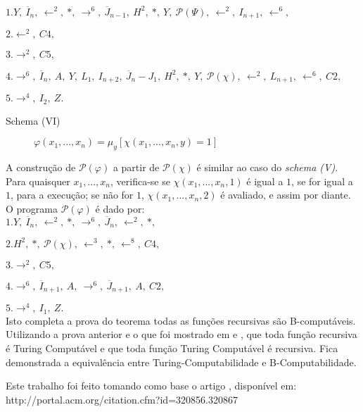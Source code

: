 \documentclass[10pt,letterpaper]{article}
\begin{document}
$1.Y,\ \overline{I}_n,\ \leftarrow^2,\ *,\ \rightarrow^6,\ \overline{J}_{n-1},\ H^2,\ *,\ Y,\ \mathcal{P}(\Psi),\ \leftarrow^2,\ I_{n+1},\ \leftarrow^6,$

$2.\leftarrow^2,\ C4,$

$3.\rightarrow^2,\ C5,$

$4.\rightarrow^6,\ \overline{I}_n,\ A,\ Y,\ L_1,\ I_{n+2},\ \overline{J}_n - J_1,\ H^2,\ *,\ Y,\ \mathcal{P}(\chi),\ \leftarrow^2,\ L_{n+1},\ \leftarrow^6,\ C2,$

$5.\rightarrow^4,\ I_2,\ Z.$

\begin{description}
\item[Schema (VI)] $\varphi(x_1, ..., x_n) = \mu_y[\chi(x_1, ..., x_n, y) = 1]$
\end{description}

A constru\c{c}\~{a}o de $\mathcal{P}(\varphi)$ a partir de $\mathcal{P}(\chi)$ \'e similar ao caso do \textit{schema (V)}. Para quaisquer $x_1, ..., x_n$, verifica-se se $\chi(x_1, ..., x_n, 1)$ \'e igual a $1$, se for igual a $1$, para a execu\c{c}\~{a}o; se n\~{a}o for $1$, $\chi(x_1, ..., x_n, 2)$ \'e avaliado, e assim por diante.
O programa $\mathcal{P}(\varphi)$ \'e dado por:\\

$1.Y,\ \overline{I}_n,\ \leftarrow^2,\ *,\ \rightarrow^6,\ \overline{J}_n,\ \leftarrow^2,\ *,$

$2.H^2,\ *,\ \mathcal{P}(\chi),\ \leftarrow^3,\ *,\ \leftarrow^8,\ C4,$

$3.\rightarrow^2,\ C5,$

$4.\rightarrow^6,\ \overline{I}_{n+1},\ A,\ \rightarrow^6,\ \overline{J}_{n+1},\ A,\ C2,$

$5.\rightarrow^4,\ I_1,\ Z.$\\

Isto completa a prova do teorema todas as fun\c{c}\~{o}es recursivas s\~{a}o B-comput\'aveis.\\

Utilizando a prova anterior e o que foi mostrado em \cite{Sudkamp} e \cite{Blauth}, que toda fun\c{c}\~{a}o recursiva \'e Turing Comput\'avel e que toda fun\c{c}\~{a}o Turing Comput\'avel \'e recursiva. Fica demonstrada a equival\^encia entre Turing-Computabilidade e B-Computabilidade.


\renewcommand{\refname}{Refer\^encias}



Este trabalho foi feito tomando como base o artigo \cite{Wang}, dispon\'ivel em:\\ http://portal.acm.org/citation.cfm?id=320856.320867
\end{document}
